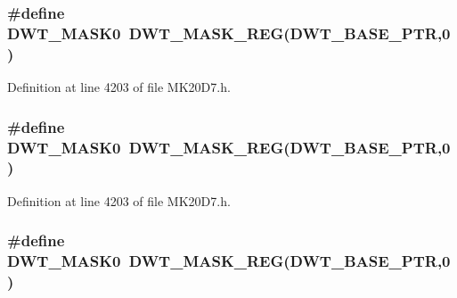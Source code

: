 \subsubsection[{\texorpdfstring{D\+W\+T\+\_\+\+M\+A\+S\+K0}{DWT_MASK0}}]{\setlength{\rightskip}{0pt plus 5cm}\#define D\+W\+T\+\_\+\+M\+A\+S\+K0~{\bf D\+W\+T\+\_\+\+M\+A\+S\+K\+\_\+\+R\+EG}({\bf D\+W\+T\+\_\+\+B\+A\+S\+E\+\_\+\+P\+TR},0)}\hypertarget{group___d_w_t___register___accessor___macros_ga6eb360c4a4139093831957c762570597}{}\label{group___d_w_t___register___accessor___macros_ga6eb360c4a4139093831957c762570597}


Definition at line 4203 of file M\+K20\+D7.\+h.

\subsubsection[{\texorpdfstring{D\+W\+T\+\_\+\+M\+A\+S\+K0}{DWT_MASK0}}]{\setlength{\rightskip}{0pt plus 5cm}\#define D\+W\+T\+\_\+\+M\+A\+S\+K0~{\bf D\+W\+T\+\_\+\+M\+A\+S\+K\+\_\+\+R\+EG}({\bf D\+W\+T\+\_\+\+B\+A\+S\+E\+\_\+\+P\+TR},0)}\hypertarget{group___d_w_t___register___accessor___macros_ga6eb360c4a4139093831957c762570597}{}\label{group___d_w_t___register___accessor___macros_ga6eb360c4a4139093831957c762570597}


Definition at line 4203 of file M\+K20\+D7.\+h.

\subsubsection[{\texorpdfstring{D\+W\+T\+\_\+\+M\+A\+S\+K0}{DWT_MASK0}}]{\setlength{\rightskip}{0pt plus 5cm}\#define D\+W\+T\+\_\+\+M\+A\+S\+K0~{\bf D\+W\+T\+\_\+\+M\+A\+S\+K\+\_\+\+R\+EG}({\bf D\+W\+T\+\_\+\+B\+A\+S\+E\+\_\+\+P\+TR},0)}\hypertarget{group___d_w_t___register___accessor___macros_ga6eb360c4a4139093831957c762570597}{}\label{group___d_w_t___register___accessor___macros_ga6eb360c4a4139093831957c762570597}


